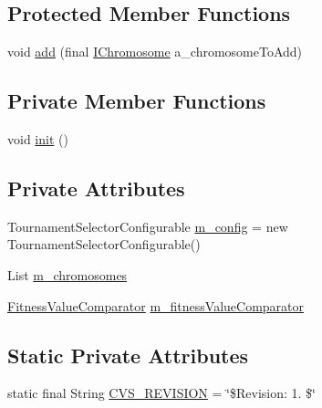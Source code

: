 \subsection*{Protected Member Functions}
\begin{DoxyCompactItemize}
\item 
void \hyperlink{classorg_1_1jgap_1_1impl_1_1_tournament_selector_aef2090f214509436ca1ce055e6ab5b3a}{add} (final \hyperlink{interfaceorg_1_1jgap_1_1_i_chromosome}{I\-Chromosome} a\-\_\-chromosome\-To\-Add)
\end{DoxyCompactItemize}
\subsection*{Private Member Functions}
\begin{DoxyCompactItemize}
\item 
void \hyperlink{classorg_1_1jgap_1_1impl_1_1_tournament_selector_aec328a5a1dc3712dc044581bd1dfe1af}{init} ()
\end{DoxyCompactItemize}
\subsection*{Private Attributes}
\begin{DoxyCompactItemize}
\item 
Tournament\-Selector\-Configurable \hyperlink{classorg_1_1jgap_1_1impl_1_1_tournament_selector_a5dbb6a9b366e82259aa1c87143be7961}{m\-\_\-config} = new Tournament\-Selector\-Configurable()
\item 
List \hyperlink{classorg_1_1jgap_1_1impl_1_1_tournament_selector_ad3c694c7809a5a14702d4d2dde7d246c}{m\-\_\-chromosomes}
\item 
\hyperlink{classorg_1_1jgap_1_1impl_1_1_tournament_selector_1_1_fitness_value_comparator}{Fitness\-Value\-Comparator} \hyperlink{classorg_1_1jgap_1_1impl_1_1_tournament_selector_a3585804c6e7926efc37e9d4f52692f49}{m\-\_\-fitness\-Value\-Comparator}
\end{DoxyCompactItemize}
\subsection*{Static Private Attributes}
\begin{DoxyCompactItemize}
\item 
static final String \hyperlink{classorg_1_1jgap_1_1impl_1_1_tournament_selector_a2c232860fc2475058679a355f4618a57}{C\-V\-S\-\_\-\-R\-E\-V\-I\-S\-I\-O\-N} = \char`\"{}\$Revision\-: 1. \$\char`\"{}
\end{DoxyCompactItemize}
